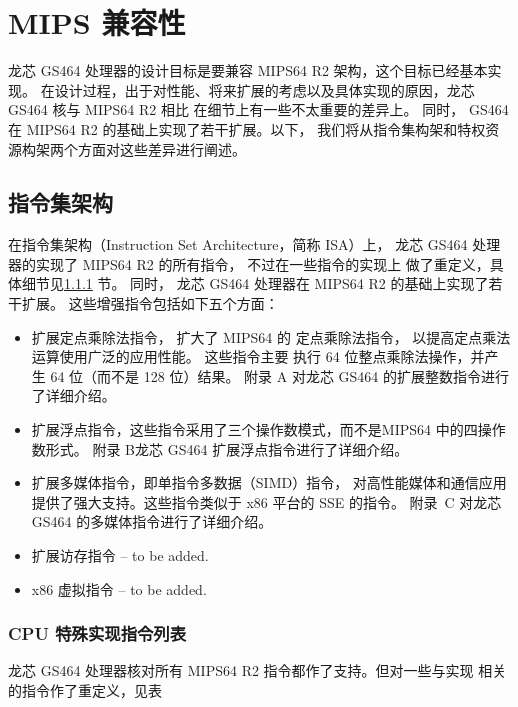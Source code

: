 \chapter{MIPS 兼容性}

龙芯 GS464 处理器的设计目标是要兼容 MIPS64 R2 架构，这个目标已经基本实现。
在设计过程，出于对性能、将来扩展的考虑以及具体实现的原因，龙芯 GS464 核与 MIPS64 R2 相比
在细节上有一些不太重要的差异上。 同时， GS464 在 MIPS64 R2 的基础上实现了若干扩展。以下，
我们将从指令集构架和特权资源构架两个方面对这些差异进行阐述。

\section{指令集架构}

在指令集架构（Instruction Set Architecture，简称 ISA）上，
龙芯 GS464 处理器的实现了 MIPS64 R2 的所有指令， 不过在一些指令的实现上
做了重定义，具体细节见\ref{sec:gsSpecialInstruction} 节。
同时， 龙芯 GS464 处理器在 MIPS64 R2 的基础上实现了若干扩展。
这些增强指令包括如下五个方面：
\begin{itemize}
  \item 扩展定点乘除法指令， 扩大了 MIPS64 的 定点乘除法指令，
    以提高定点乘法运算使用广泛的应用性能。 这些指令主要 执行 64
    位整点乘除法操作，并产生 64 位（而不是 128 位）结果。 附录 A
    对龙芯 GS464 的扩展整数指令进行了详细介绍。
  \item 扩展浮点指令，这些指令采用了三个操作数模式，而不是MIPS64
    中的四操作数形式。 附录 B龙芯 GS464 扩展浮点指令进行了详细介绍。
  \item 扩展多媒体指令，即单指令多数据（SIMD）指令，
    对高性能媒体和通信应用提供了强大支持。这些指令类似于 x86 平台的 SSE
    的指令。 附录~C 对龙芯 GS464 的多媒体指令进行了详细介绍。
  \item 扩展访存指令 -- to be added.
  \item x86 虚拟指令 -- to be added.
\end{itemize}

\subsection{CPU 特殊实现指令列表}\label{sec:gsSpecialInstruction}

龙芯 GS464 处理器核对所有 MIPS64 R2 指令都作了支持。但对一些与实现
相关的指令作了重定义，见表

